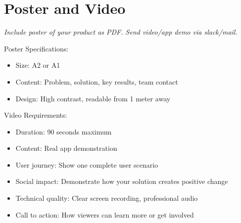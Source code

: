 \section{Poster and Video}
\emph{Include poster of your product as PDF. Send video/app demo via slack/mail.}

Poster Specifications:
\begin{itemize}
    \item Size: A2 or A1
    \item Content: Problem, solution, key results, team contact
    \item Design: High contrast, readable from 1 meter away
\end{itemize}

Video Requirements:
\begin{itemize}
    \item Duration: 90 seconds maximum
    \item Content: Real app demonstration
    \item User journey: Show one complete user scenario
    \item Social impact: Demonstrate how your solution creates positive change
    \item Technical quality: Clear screen recording, professional audio
    \item Call to action: How viewers can learn more or get involved
\end{itemize}
